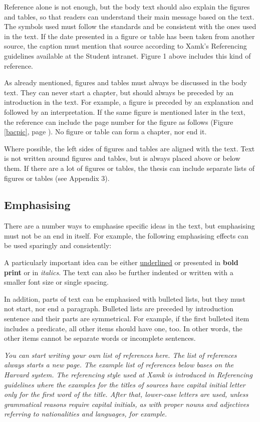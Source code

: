 \documentclass[12pt]{article}
\begin{document}
Reference alone is not enough, but the body text should also explain the figures and tables, so that readers can understand their main message based on the text. The symbols used must follow the standards and be consistent with the ones used in the text. If the date presented in a figure or table has been taken from another source, the caption must mention that source according to Xamk’s Referencing guidelines available at the Student intranet. Figure 1 above includes this kind of reference.

As already mentioned, figures and tables must always be discussed in the body text. They can never start a chapter, but should always be preceded by an introduction in the text. For example, a figure is preceded by an explanation and followed by an interpretation. If the same figure is mentioned later in the text, the reference can include the page number for the figure as follows (Figure \ref{bacpic}, page \pageref{bacpic}). No figure or table can form a chapter, nor end it.

Where possible, the left sides of figures and tables are aligned with the text. Text is not written around figures and tables, but is always placed above or below them. If there are a lot of figures or tables, the thesis can include separate lists of figures or tables (see Appendix 3).

\subsection{Emphasising}

There are a number ways to emphasise specific ideas in the text, but emphasising must not be an end in itself. For example, the following emphasising effects can be used sparingly and consistently:

{\small A particularly important idea can be either \underline{underlined} or presented in \textbf{bold print} or in \textit{italics}. The text can also be further indented or written with a smaller font size or single spacing.}

In addition, parts of text can be emphasised with bulleted lists, but they must not start, nor end a paragraph. Bulleted lists are preceded by introduction sentence and their parts are symmetrical. For example, if the first bulleted item includes a predicate, all other items should have one, too. In other words, the other items cannot be separate words or incomplete sentences.

\textit{You can start writing your own list of references here. The list of references always starts a new page. The example list of references below bases on the Harvard system. The referencing style used at Xamk is introduced in Referencing guidelines where the examples for the titles of sources have capital initial letter only for the first word of the title. After that, lower-case letters are used, unless grammatical reasons require capital initials, as with proper nouns and adjectives referring to nationalities and languages, for example.}

\textcite{cd98}

\textcite{fi05}

\textcite{je09}

\textcite{wa16}

\newpage
\printbibliography 
\end{document}
